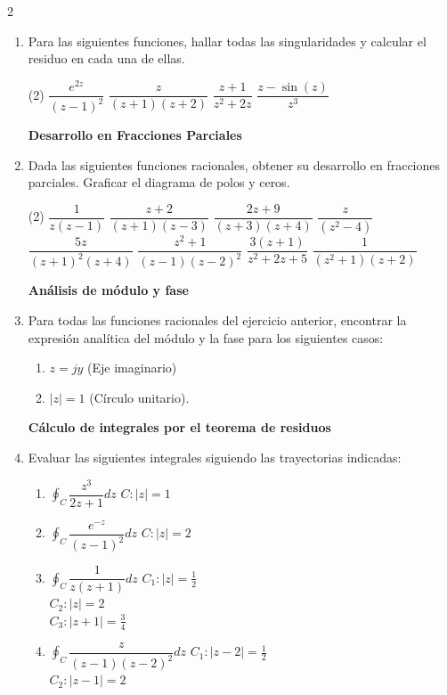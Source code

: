 \documentclass[10pt,a4paper]{article}
\begin{document}
\begin{multicols}{2}
\begin{enumerate}
			\textbf{Cálculo de residuos}
			\item {Para las siguientes funciones, hallar todas las singularidades y calcular el residuo en cada una de ellas.}
			\begin{tasks}(2)
				\task $\dfrac{e^{2z}}{(z-1)^2}$
				\task $\dfrac{z}{(z+1)(z+2)}$
				\task $\dfrac{z+1}{z^2+2z}$
				\task $\dfrac{z-\sin(z)}{z^3}$
			\end{tasks}
			
			\textbf{Desarrollo en Fracciones Parciales}
			\item {Dada las siguientes funciones racionales, obtener su desarrollo en fracciones parciales. Graficar el diagrama de polos y ceros.}
			\begin{tasks}(2)
				\task $\dfrac{1}{z(z-1)}$
				\task $\dfrac{z+2}{(z+1)(z-3)}$
				\task $\dfrac{2z+9}{(z+3)(z+4)}$
				\task $\dfrac{z}{(z^2-4)}$
				\task $\dfrac{5z}{(z+1)^2(z+4)}$
				\task $\dfrac{z^2+1}{(z-1)(z-2)^2}$
				\task $\dfrac{3(z+1)}{z^2+2z+5}$
				\task $\dfrac{1}{(z^2+1)(z+2)}$
			\end{tasks}
			
			\textbf{Análisis de módulo y fase}
			\item {Para todas las funciones racionales del ejercicio anterior, encontrar la expresión analítica del módulo y la fase para los siguientes casos:}
			\begin{enumerate}
				\item $z=jy$ (Eje imaginario)
				\item $|z|=1$ (Círculo unitario).
			\end{enumerate}
			
			\textbf{Cálculo de integrales por el teorema de residuos}
			\item {Evaluar las siguientes integrales siguiendo las trayectorias indicadas:}
			\begin{enumerate}
				\item $\displaystyle \oint_C \dfrac{z^3}{2z+1}dz$ \hfill $C:|z|=1$
				\item $\displaystyle \oint_C \dfrac{e^{-z}}{(z-1)^2}dz$ \hfill $C:|z|=2$
				\item $\displaystyle \oint_C \dfrac{1}{z(z+1)}dz$ \hfill $C_1:|z|=\frac{1}{2}$ \\
				 \null\hfill $C_2:|z|=2$ \\
				 \null\hfill $C_3:|z+1|=\frac{3}{4}$
				\item $\displaystyle \oint_C \dfrac{z}{(z-1)(z-2)^2}dz$ \hfill $C_1:|z-2|=\frac{1}{2}$ \\
				\null\hfill $C_2:|z-1|=2$
			\end{enumerate}
			


\end{enumerate}
\end{multicols}
\end{document}
